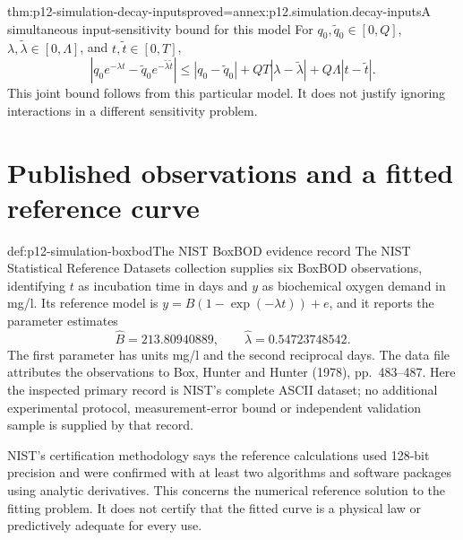 \begin{hbtheorem}{thm:p12-simulation-decay-inputs}{proved=annex:p12.simulation.decay-inputs}{A simultaneous input-sensitivity bound for this model}
For \(q_0,\widetilde q_0\in[0,Q]\),
\(\lambda,\widetilde\lambda\in[0,\Lambda]\), and
\(t,\widetilde t\in[0,T]\),
\[
 |q_0e^{-\lambda t}-\widetilde q_0e^{-\widetilde\lambda\widetilde t}|
 \leq |q_0-\widetilde q_0|
 +QT|\lambda-\widetilde\lambda|
 +Q\Lambda|t-\widetilde t|.
\]
This joint bound follows from this particular model. It does not
justify ignoring interactions in a different sensitivity problem.
\end{hbtheorem}

\section{Published observations and a fitted reference curve}

\begin{hbdefinition}{def:p12-simulation-boxbod}{The NIST BoxBOD evidence record}
The NIST Statistical Reference Datasets collection supplies six
BoxBOD observations, identifying \(t\) as incubation time in days
and \(y\) as biochemical oxygen demand in mg/l. Its reference
model is \(y=B(1-\exp(-\lambda t))+e\), and it reports the
parameter estimates
\[
 \widehat B=213.80940889,\qquad
 \widehat\lambda=0.54723748542.
\]
The first parameter has units mg/l and the second reciprocal days.
The data file attributes the observations to Box, Hunter and Hunter
(1978), pp.~483--487. Here the inspected primary record is NIST's
complete ASCII dataset; no additional experimental protocol,
measurement-error bound or independent validation sample is supplied
by that record. \cite{NISTBoxBOD}

NIST's certification methodology says the reference calculations
used 128-bit precision and were confirmed with at least two algorithms
and software packages using analytic derivatives. This concerns
the numerical reference solution to the fitting problem. It does
not certify that the fitted curve is a physical law or predictively
adequate for every use. \cite[Methodology]{NISTBoxBODCertification}
\end{hbdefinition}

